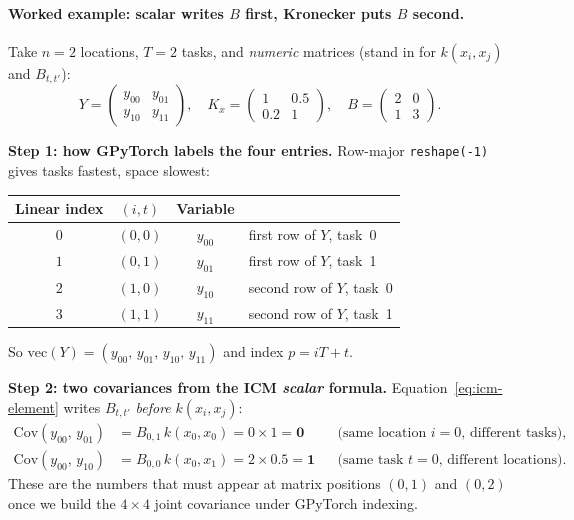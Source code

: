 \documentclass[11pt]{article}
\theoremstyle{plain}
\begin{document}
\paragraph{Worked example: scalar writes $B$ first, Kronecker puts $B$ second.}
\label{par:kron-worked-example}
Take $n=2$ locations, $T=2$ tasks, and \emph{numeric} matrices (stand in for $k(x_i,x_j)$ and $B_{t,t'}$):
\begin{equation*}
  Y = \begin{pmatrix} y_{00} & y_{01} \\ y_{10} & y_{11} \end{pmatrix},
  \quad
  K_x = \begin{pmatrix} 1 & 0.5 \\ 0.2 & 1 \end{pmatrix},
  \quad
  B = \begin{pmatrix} 2 & 0 \\ 1 & 3 \end{pmatrix}.
\end{equation*}

\medskip
\textbf{Step 1: how GPyTorch labels the four entries.}
Row-major \texttt{reshape(-1)} gives tasks fastest, space slowest:
\begin{center}
\renewcommand{\arraystretch}{1.15}
\begin{tabular}{@{}cccl@{}}
\toprule
\textbf{Linear index} & \textbf{$(i,t)$} & \textbf{Variable} & \\
\midrule
$0$ & $(0,0)$ & $y_{00}$ & first row of $Y$, task~0 \\
$1$ & $(0,1)$ & $y_{01}$ & first row of $Y$, task~1 \\
$2$ & $(1,0)$ & $y_{10}$ & second row of $Y$, task~0 \\
$3$ & $(1,1)$ & $y_{11}$ & second row of $Y$, task~1 \\
\bottomrule
\end{tabular}
\end{center}
So $\mathrm{vec}(Y) = (y_{00},\, y_{01},\, y_{10},\, y_{11})$ and index $p = iT + t$.

\medskip
\textbf{Step 2: two covariances from the ICM \emph{scalar} formula.}
Equation~\eqref{eq:icm-element} writes $B_{t,t'}$ \emph{before} $k(x_i,x_j)$:
\begin{align*}
  \mathrm{Cov}(y_{00},\, y_{01})
  &= B_{0,1}\, k(x_0,x_0) = 0 \times 1 = \mathbf{0}
  &&\text{(same location $i{=}0$, different tasks),} \\
  \mathrm{Cov}(y_{00},\, y_{10})
  &= B_{0,0}\, k(x_0,x_1) = 2 \times 0.5 = \mathbf{1}
  &&\text{(same task $t{=}0$, different locations).}
\end{align*}
These are the numbers that must appear at matrix positions $(0,1)$ and $(0,2)$ once we build the
$4 \times 4$ joint covariance under GPyTorch indexing.
\end{document}
